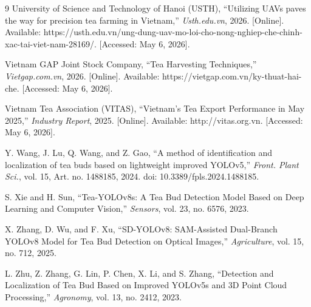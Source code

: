 \documentclass[a4paper,12pt]{report}
\begin{document}
\begin{thebibliography}{9}
University of Science and Technology of Hanoi (USTH), 
``Utilizing UAVs paves the way for precision tea farming in Vietnam,'' 
\textit{Usth.edu.vn}, 
2026. [Online]. Available: https://usth.edu.vn/ung-dung-uav-mo-loi-cho-nong-nghiep-che-chinh-xac-tai-viet-nam-28169/. [Accessed: May 6, 2026].

Vietnam GAP Joint Stock Company, 
``Tea Harvesting Techniques,'' 
\textit{Vietgap.com.vn}, 
2026. [Online]. Available: https://vietgap.com.vn/ky-thuat-hai-che. [Accessed: May 6, 2026].

Vietnam Tea Association (VITAS), 
``Vietnam's Tea Export Performance in May 2025,'' 
\textit{Industry Report}, 
2025. [Online]. Available: http://vitas.org.vn. [Accessed: May 6, 2026].

Y. Wang, J. Lu, Q. Wang, and Z. Gao, 
``A method of identification and localization of tea buds based on lightweight improved YOLOv5,'' 
\textit{Front. Plant Sci.}, vol. 15, Art. no. 1488185, 2024. doi: 10.3389/fpls.2024.1488185.

S. Xie and H. Sun, 
``Tea-YOLOv8s: A Tea Bud Detection Model Based on Deep Learning and Computer Vision,'' 
\textit{Sensors}, vol. 23, no. 6576, 2023.

X. Zhang, D. Wu, and F. Xu, 
``SD-YOLOv8: SAM-Assisted Dual-Branch YOLOv8 Model for Tea Bud Detection on Optical Images,'' 
\textit{Agriculture}, vol. 15, no. 712, 2025.

L. Zhu, Z. Zhang, G. Lin, P. Chen, X. Li, and S. Zhang, 
``Detection and Localization of Tea Bud Based on Improved YOLOv5s and 3D Point Cloud Processing,'' 
\textit{Agronomy}, vol. 13, no. 2412, 2023.






\end{thebibliography}
\end{document}

